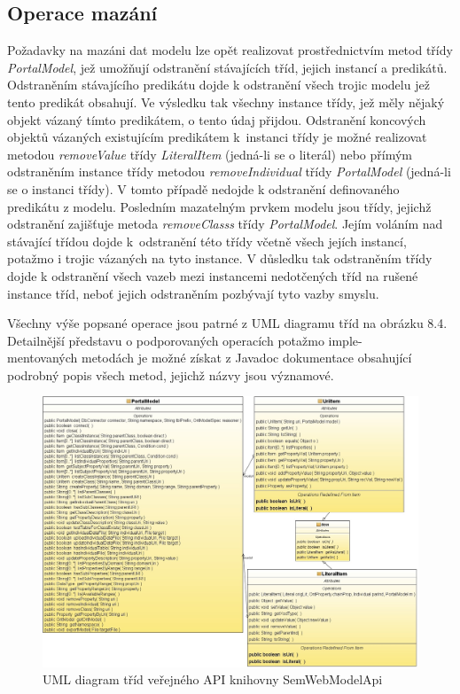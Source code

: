 \documentclass{projekt}
\begin{document}
\subsection{Operace mazání}
\hspace{0.65cm}Požadavky na mazáni dat modelu lze opět realizovat prostřednictvím metod třídy {\it PortalModel}, jež umožňují odstranění stávajících tříd, jejich instancí a predikátů. Odstraněním stávajícího predikátu dojde k odstranění všech trojic modelu jež tento predikát obsahují. Ve výsledku tak všechny instance třídy, jež měly nějaký objekt vázaný tímto predikátem, o tento údaj přijdou. Odstranění koncových objektů vázaných existujícím predikátem k~instanci třídy je možné realizovat metodou {\it removeValue} třídy {\it LiteralItem} (jedná-li se o literál) nebo přímým odstraněním instance třídy metodou {\it removeIndividual} třídy {\it PortalModel} (jedná-li se o instanci třídy). V tomto případě nedojde k odstranění definovaného predikátu z modelu. Posledním mazatelným prvkem modelu jsou třídy, jejichž odstranění zajišťuje metoda {\it removeClasss} třídy {\it PortalModel}. Jejím voláním nad stávající třídou dojde k~odstranění této třídy včetně všech jejích instancí, potažmo i trojic vázaných na tyto instance. V důsledku tak odstraněním třídy dojde k odstranění všech vazeb mezi instancemi nedotčených tříd na rušené instance tříd, neboť jejich odstraněním pozbývají tyto vazby smyslu.

Všechny výše popsané operace jsou patrné z UML diagramu tříd na obrázku 8.4. Detailnější představu o podporovaných operacích potažmo imple-\\mentovaných metodách je možné získat z Javadoc dokumentace obsahující podrobný popis všech metod, jejichž názvy jsou významové.


\begin{figure}[htb]
\begin{center}
\includegraphics[scale=0.37]{api.jpg}
\caption{UML diagram tříd veřejného API knihovny SemWebModelApi}
\end{center}
\end{figure}
\end{document}
